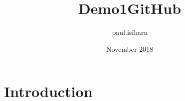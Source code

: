 \documentclass{article}
\title{Demo1GitHub}
\author{paul.isihara }
\date{November 2018}
\begin{document}
\maketitle

\section{Introduction}
\end{document}
